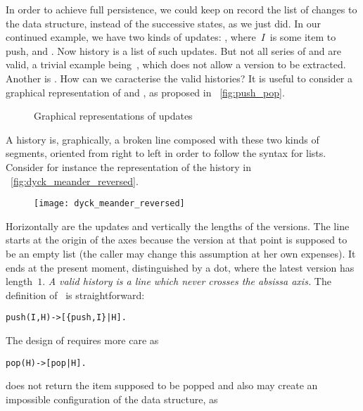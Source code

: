 In order to achieve full persistence, we could keep on record the list
of changes to the data structure, instead of the successive states, as
we just did. In our continued example, we have two kinds of updates:
, where~\(I\)~is some item to push, and
. Now history is a list of such updates. But not all
series of  and  are valid, a trivial
example being~\erlcode{[pop]}, which does not allow a version to be
extracted. Another is . How can we
caracterise the valid histories? It is useful to consider a graphical
representation of  and , as proposed in
\fig~\vref{fig:push_pop}.
\begin{figure}
\centering
{}
\qquad
{}
\caption{Graphical representations of updates\label{fig:push_pop}}
\end{figure}
A history is, graphically, a broken line composed with these two kinds
of segments, oriented from right to left in order to follow the
\Erlang syntax for lists. Consider for instance the representation of
the history
 in
\fig~\vref{fig:dyck_meander_reversed}.
\begin{figure}[!b]
\centering
\texttt{[image: dyck\_meander\_reversed]}
\caption{
\label{fig:dyck_meander_reversed}}
\end{figure}
Horizontally are the updates and vertically the lengths of the
versions. The line starts at the origin of the axes because the
version at that point is supposed to be an empty list (the caller may
change this assumption at her own expenses). It ends at the present
moment, distinguished by a dot, where the latest version has
length~\(1\). \emph{A valid history is a line which never crosses the
  absissa axis.} The definition of~ is
straightforward:
\begin{alltt}
push(I,H) -> [\{push,I\}|H].
\end{alltt}
The design of  requires more care as
\begin{alltt}
pop(H) -> [pop|H].\hfill% \emph{Incomplete}
\end{alltt}
does not return the item supposed to be popped and also may create an
impossible configuration of the data structure, as~
